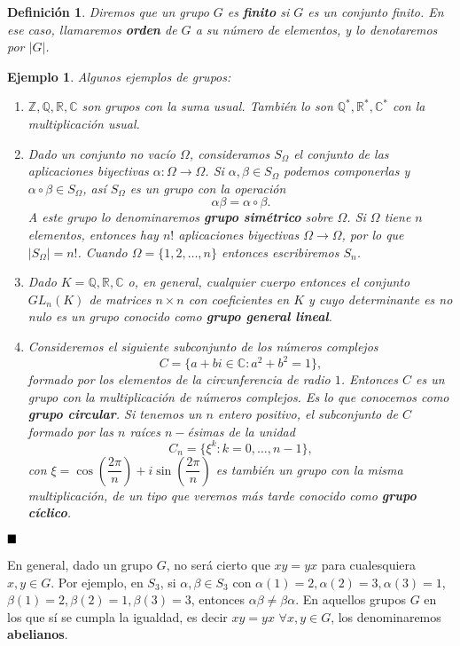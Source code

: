 \documentclass[12pt]{article}
\newtheorem{definition}[theorem]{Definición}
\newtheorem{example}{Ejemplo}[theorem]
\begin{document}
\begin{definition}Diremos que un grupo $G$ es \textbf{finito} si $G$ es un conjunto finito. En ese caso, llamaremos \textbf{orden} de $G$ a su número de elementos, y lo denotaremos por $|G|$.
\end{definition}

\begin{example} Algunos ejemplos de grupos:
\begin{enumerate}
\item $\mathbb{Z}, \mathbb{Q}, \mathbb{R}, \mathbb{C}$ son grupos con la suma usual. También lo son $\mathbb{Q}^*, \mathbb{R}^*, \mathbb{C}^*$ con la multiplicación usual.
\item Dado un conjunto no vacío $\Omega$, consideramos $S_{\Omega}$ el conjunto de las aplicaciones biyectivas $\alpha \colon \Omega \longrightarrow \Omega$. Si $\alpha, \beta \in S_{\Omega}$ podemos componerlas y $\alpha \circ \beta \in S_{\Omega}$, así $S_{\Omega}$ es un grupo con la operación $$\alpha \beta = \alpha \circ \beta.$$ A este grupo lo denominaremos \textbf{grupo simétrico} sobre $\Omega$. Si $\Omega$ tiene $n$ elementos, entonces hay $n!$ aplicaciones biyectivas $\Omega \longrightarrow \Omega$, por lo que $|S_{\Omega}| = n!$. Cuando $\Omega = \lbrace 1, 2, \ldots, n \rbrace$ entonces escribiremos $S_{n}$.
\item Dado $K = \mathbb{Q}, \mathbb{R}, \mathbb{C}$ o, en general, cualquier cuerpo entonces el conjunto $GL_{n}(K)$ de matrices $n\times n$ con coeficientes en $K$ y cuyo determinante es no nulo es un grupo conocido como \textbf{grupo general lineal}.
\item Consideremos el siguiente subconjunto de los números complejos $$C = \lbrace a+bi \in \mathbb{C}: a^2+b^2 = 1 \rbrace,$$ formado por los elementos de la circunferencia de radio $1$. Entonces $C$ es un grupo con la multiplicación de números complejos. Es lo que conocemos como \textbf{grupo circular}. Si tenemos un $n$ entero positivo, el subconjunto de $C$ formado por las $n$ raíces $n-$ésimas de la unidad $$C_{n}= \lbrace \xi^k : k =0, \ldots, n-1 \rbrace,$$ con $\xi = \cos\left( \dfrac{2\pi}{n} \right) + i\sin\left(\dfrac{2\pi}{n}\right)$ es también un grupo con la misma multiplicación, de un tipo que veremos más tarde conocido como \textbf{grupo cíclico}.
\end{enumerate}
\end{example}
$\hfill \blacksquare$


En general, dado un grupo $G$, no será cierto que $xy = yx$ para cualesquiera $x,y \in G$. Por ejemplo, en $S_{3}$, si $\alpha, \beta \in S_{3}$ con $\alpha(1) = 2, \alpha (2)=3, \alpha (3) = 1$, $\beta (1)=2, \beta(2)=1, \beta (3) = 3$, entonces $\alpha \beta \neq \beta \alpha$. En aquellos grupos $G$ en los que sí se cumpla la igualdad, es decir $xy = yx$ $\forall x,y \in G$, los denominaremos \textbf{abelianos}.
\end{document}
